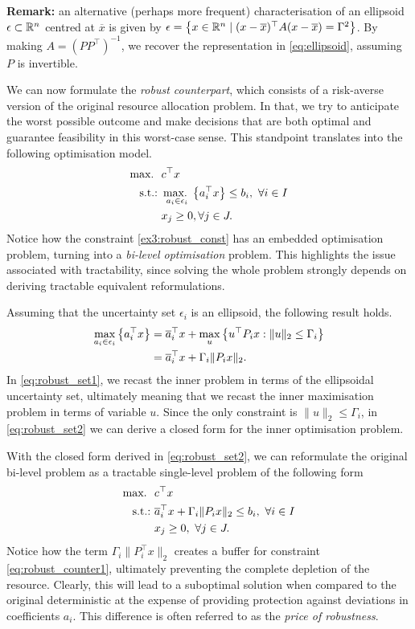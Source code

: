 {\bf Remark:} an alternative (perhaps more frequent) characterisation of an ellipsoid $\epsilon \subset \mathbb{R}^n$ centred at $\overline{x}$ is given by $\epsilon = \left\{ x \in \mathbb{R}^n \mid (x - \overline{x})^\top A(x - \overline{x}) = \Gamma^2 \right \}$. By making $A = (PP^\top)^{-1}$, we recover the representation in \eqref{eq:ellipsoid}, assuming $P$ is invertible.

We can now formulate the \emph{robust counterpart}, which consists of a risk-averse version of the original resource allocation problem. In that, we try to anticipate the worst possible outcome and make decisions that are both optimal and guarantee feasibility in this worst-case sense. This standpoint translates into the following optimisation model.
%
\begin{align}
	\mathop{\text{max.~}} \ &  c^\top x \nonumber \\
	\mathop{\text{s.t.:~}} & \mathop{\text{max.~}}_{a_{i} \in \epsilon_i}\left\{ a_i^\top x \right \} \leq b_i, \ \forall i \in I \label{ex3:robust_const}\\
	& x_j \geq 0, \forall j \in J. \nonumber
\end{align}
%
Notice how the constraint \eqref{ex3:robust_const} has an embedded optimisation problem, turning into a \emph{bi-level optimisation} problem. This highlights the issue associated with tractability, since solving the whole problem strongly depends on deriving tractable equivalent reformulations.

Assuming that the uncertainty set $\epsilon_i$ is an ellipsoid, the following result holds.
%
\begin{align}
	\max_{a_{i} \in \epsilon_i}\left\{ a_i^\top x \right \}  & = \overline{a}_i^\top x + \max_u\left\{ u^\top P_i x : \|u\|_2 \leq \Gamma_i \right \} \label{eq:robust_set1}\\
	& = \overline{a}_i^\top x + \Gamma_i\|P_i x\|_2. \label{eq:robust_set2}
\end{align}
%
In \eqref{eq:robust_set1}, we recast the inner problem in terms of the ellipsoidal uncertainty set, ultimately meaning that we recast the inner maximisation problem in terms of variable $u$. Since the only constraint is $\|u\|_2 \leq \Gamma_i$, in \eqref{eq:robust_set2} we can derive a closed form for the inner optimisation problem.

With the closed form derived in \eqref{eq:robust_set2}, we can reformulate the original bi-level problem as a tractable single-level problem of the following form
%
\begin{align}
	\maxi \ &  c^\top x \nonumber \\
	\st & \overline{a}_i^\top x + \Gamma_i\|P_i x\|_2 \leq b_i, \ \forall i \in I \label{eq:robust_counter1}\\
	& x_j \geq 0, \ \forall j \in J. \nonumber
\end{align} 
%
Notice how the term $\Gamma_i\|P_i^\top x\|_2$ creates a buffer for constraint \eqref{eq:robust_counter1}, ultimately preventing the complete depletion of the resource. Clearly, this will lead to a suboptimal solution when compared to the original deterministic at the expense of providing protection against deviations in coefficients $a_i$. This difference is often referred to as the \emph{price of robustness}.

